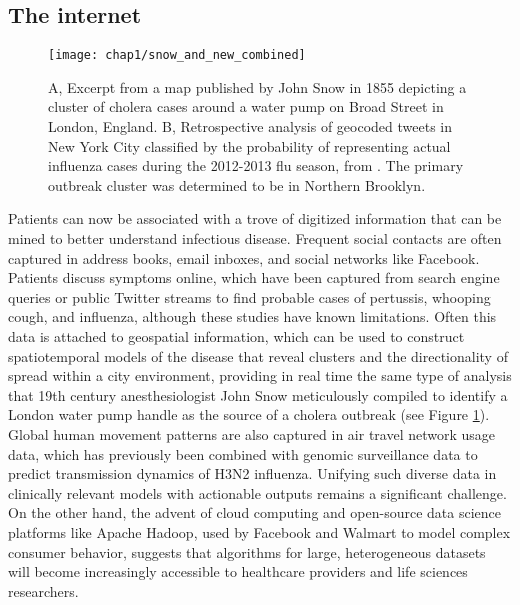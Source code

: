 \subsection{The internet}

\begin{figure}[htb]
  \texttt{[image: chap1/snow\_and\_new\_combined]}               
  \caption[Geospatial analysis, then and now]{A, Excerpt from a map published by John Snow in 1855 depicting a cluster of cholera cases around a water pump on Broad Street in London, England. B, Retrospective analysis of geocoded tweets in New York City classified by the probability of representing actual influenza cases during the 2012-2013 flu season, from \textcite{Nagar2014}. The primary outbreak cluster was determined to be in Northern Brooklyn.}
  \label{fig:snow_and_new_combined}
\end{figure}

Patients can now be associated with a trove of digitized information that can be mined to better understand infectious disease. Frequent social contacts are often captured in address books, email inboxes, and social networks like Facebook. Patients discuss symptoms online, which have been captured from search engine queries\autocite{Ginsberg2009} or public Twitter streams to find probable cases of pertussis, whooping cough, and influenza,\autocite{Nagel2013} although these studies have known limitations.\autocite{Lazer2014} Often this data is attached to geospatial information, which can be used to construct spatiotemporal models of the disease that reveal clusters and the directionality  of spread within a city environment,\autocite{Nagar2014} providing in real time the same type of analysis that 19th century anesthesiologist John Snow meticulously compiled to identify a London water pump handle as the source of a cholera outbreak (see Figure \ref{fig:snow_and_new_combined}).\autocite{Buechner2004,Snow1855} Global human movement patterns are also captured in air travel network usage data, which has previously been combined with genomic surveillance data to predict transmission dynamics of H3N2 influenza.\autocite{Lemey2014} Unifying such diverse data in clinically relevant models with actionable outputs remains a significant challenge. On the other hand, the advent of cloud computing and open-source data science platforms like Apache Hadoop, used by Facebook and Walmart to model complex consumer behavior, suggests that algorithms for large, heterogeneous datasets will become increasingly accessible to healthcare providers and life sciences researchers.\autocite{Mohammed2014}

